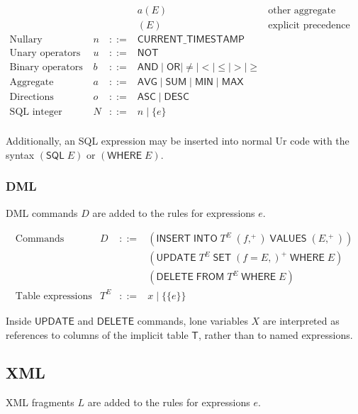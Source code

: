 \documentclass{article}
\newcommand{\mt}[1]{\mathsf{#1}}
\begin{document}
$$\begin{array}{rrcll}
  &&& a(E) & \textrm{other aggregate function} \\
  &&& (E) & \textrm{explicit precedence} \\
  \textrm{Nullary operators} & n &::=& \mt{CURRENT\_TIMESTAMP} \\
  \textrm{Unary operators} & u &::=& \mt{NOT} \\
  \textrm{Binary operators} & b &::=& \mt{AND} \mid \mt{OR} \mid \neq \mid < \mid \leq \mid > \mid \geq \\
  \textrm{Aggregate functions} & a &::=& \mt{AVG} \mid \mt{SUM} \mid \mt{MIN} \mid \mt{MAX} \\
  \textrm{Directions} & o &::=& \mt{ASC} \mid \mt{DESC} \\
  \textrm{SQL integer} & N &::=& n \mid \{e\} \\
\end{array}$$

Additionally, an SQL expression may be inserted into normal Ur code with the syntax $(\mt{SQL} \; E)$ or $(\mt{WHERE} \; E)$.

\subsubsection{DML}

DML commands $D$ are added to the rules for expressions $e$.

$$\begin{array}{rrcll}
  \textrm{Commands} & D &::=& (\mt{INSERT} \; \mt{INTO} \; T^E \; (f,^+) \; \mt{VALUES} \; (E,^+)) \\
  &&& (\mt{UPDATE} \; T^E \; \mt{SET} \; (f = E,)^+ \; \mt{WHERE} \; E) \\
  &&& (\mt{DELETE} \; \mt{FROM} \; T^E \; \mt{WHERE} \; E) \\
  \textrm{Table expressions} & T^E &::=& x \mid \{\{e\}\}
\end{array}$$

Inside $\mt{UPDATE}$ and $\mt{DELETE}$ commands, lone variables $X$ are interpreted as references to columns of the implicit table $\mt{T}$, rather than to named expressions.

\subsection{XML}

XML fragments $L$ are added to the rules for expressions $e$.
\end{document}
